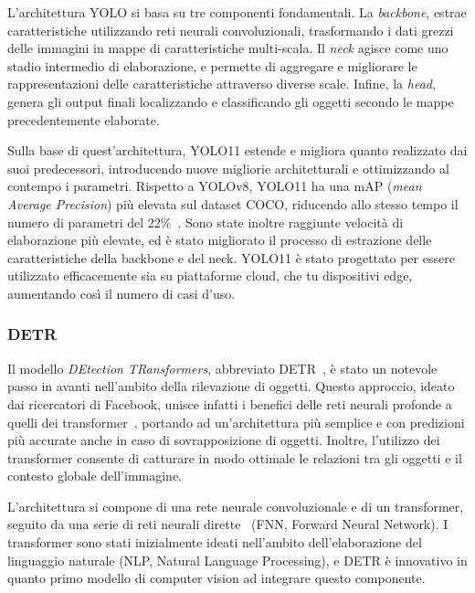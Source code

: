 \documentclass[12pt]{report}
\begin{document}
L'architettura YOLO si basa su tre componenti fondamentali. La \textit{backbone}, estrae caratteristiche utilizzando reti neurali convoluzionali, trasformando i dati grezzi delle immagini in mappe di caratteristiche multi-scala. Il \textit{neck} agisce come uno stadio intermedio di elaborazione, e permette di aggregare e migliorare le rappresentazioni delle caratteristiche attraverso diverse scale. Infine, la \textit{head}, genera gli output finali localizzando e classificando gli oggetti secondo le mappe precedentemente elaborate.

Sulla base di quest'architettura, YOLO11 estende e migliora quanto realizzato dai suoi predecessori, introducendo nuove migliorie architetturali e ottimizzando al contempo i parametri. Rispetto a YOLOv8, YOLO11 ha una mAP (\textit{mean Average Precision}) più elevata sul dataset COCO, riducendo allo stesso tempo il numero di parametri del 22\%~\cite{khanam2024yolov11overviewkeyarchitectural}. Sono state inoltre raggiunte velocità di elaborazione più elevate, ed è stato migliorato il processo di estrazione delle caratteristiche della backbone e del neck. YOLO11 è stato progettato per essere utilizzato efficacemente sia su piattaforme cloud, che tu dispositivi edge, aumentando così il numero di casi d'uso.

\subsubsection{DETR}

Il modello \textit{DEtection TRansformers}, abbreviato DETR~\cite{carion2020end}, è stato un notevole passo in avanti nell'ambito della rilevazione di oggetti. Questo approccio, ideato dai ricercatori di Facebook, unisce infatti i benefici delle reti neurali profonde a quelli dei transformer~\cite{10.1145/3505244}, portando ad un'architettura più semplice e con predizioni più accurate anche in caso di sovrapposizione di oggetti. Inoltre, l'utilizzo dei transformer consente di catturare in modo ottimale le relazioni tra gli oggetti e il contesto globale dell'immagine.

L'architettura si compone di una rete neurale convoluzionale e di un transformer, seguito da una serie di reti neurali dirette~\cite{article_890416} (FNN, Forward Neural Network). I transformer sono stati inizialmente ideati nell'ambito dell'elaborazione del linguaggio naturale (NLP, Natural Language Processing), e DETR è innovativo in quanto primo modello di computer vision ad integrare questo componente.
\end{document}
